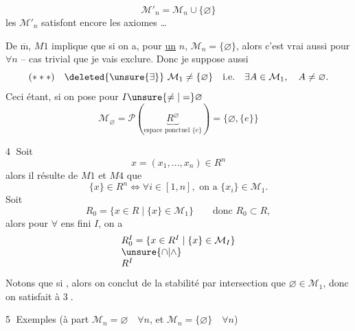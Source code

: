 \[
\mathcal M'_n=\mathcal M_n\cup\{\varnothing\}
\]
les $\mathcal M'_n$ satisfont encore les axiomes \ldots


De $\overline{\mathrm m}$,  $M1$ implique que si on a, pour \uline{un} $n$,  $\mathcal M_n=\{\varnothing\}$, alors c'est vrai aussi pour $\forall n$ -- cas trivial  que je vais exclure. Donc je suppose aussi
\[
(***)\quad\deleted{\unsure{\exists}}\ \mathcal M_1\ne\{\varnothing\}\quad\text{i.e.}\quad\exists A\in\mathcal M_1,\quad A\ne\varnothing.
\]
Ceci étant, si on pose pour $I\unsure{\ne|=}\varnothing$
\[
\mathcal M_\varnothing=\mathcal P(\underbrace{R^\varnothing}_{\text{espace ponctuel }\{e\}})=\{\varnothing,\{e\}\}
\]

\textcircled{4} Soit 
\[
x=(x_1,\ldots,x_n)\in R^n
\]
alors il résulte de $M1$ et $M4$ que
\[
\{x\}\in R^n\Longleftrightarrow\forall i\in[1,n],\text{ on a }\{x_i\}\in\mathcal M_1.
\]
Soit
\[
R_0=\{x\in R\mid\{x\}\in\mathcal M_1\}\qquad\text{donc }R_0\subset R,
\]
alors pour $\forall$ ens fini $I$, on a
\[
\begin{array}{l}
R_0^I=\{x\in R^I\mid\{x\}\in\mathcal M_I\}\\
\unsure{\cap|\wedge}\\
R^I
\end{array}
\]
Notons que si  , alors on conclut de la stabilité  par intersection que $\varnothing\in\mathcal M_1$, donc on satisfait à \textcircled{3}.

\textcircled{5} Exemples (à part $\mathcal M_n=\varnothing\quad\forall n$, et $\mathcal M_n=\{\varnothing\}\quad\forall n$)
